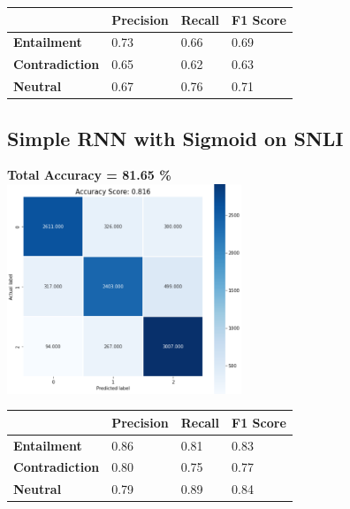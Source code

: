 \documentclass[12pt, conference]{IEEEtran}
\begin{document}
\begin{table}[]
\begin{tabular}{|l|l|l|l|}
\hline
                       & \textbf{Precision} & \textbf{Recall} & \textbf{F1 Score} \\ \hline
\textbf{Entailment}    & 0.73               & 0.66            & 0.69              \\ \hline
\textbf{Contradiction} & 0.65               & 0.62            & 0.63              \\ \hline
\textbf{Neutral}       & 0.67               & 0.76            & 0.71              \\ \hline
\end{tabular}
\end{table}

\subsection{Simple RNN with Sigmoid on SNLI}
\textbf{Total Accuracy = 81.65 \%}\\
\includegraphics[width=7cm]{images/results/SNLIsigmoid.png}

\begin{table}[h]
\begin{tabular}{|l|l|l|l|}
\hline
                       & \textbf{Precision} & \textbf{Recall} & \textbf{F1 Score} \\ \hline
\textbf{Entailment}    & 0.86               & 0.81            & 0.83              \\ \hline
\textbf{Contradiction} & 0.80               & 0.75            & 0.77              \\ \hline
\textbf{Neutral}       & 0.79               & 0.89            & 0.84              \\ \hline
\end{tabular}
\end{table}
\end{document}
